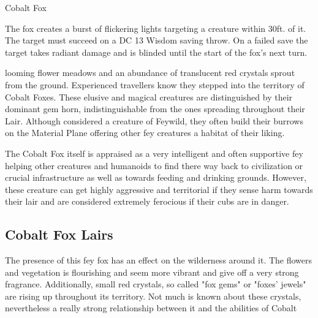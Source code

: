 \begin{DndMonster}[width=0.5\textwidth]{Cobalt Fox\label{monster:CobaltFox}}
    \DndMonsterAttack[
      name=Gore,
      distance=melee, %
      mod=+4,
      reach=5,
      targets=one target,
      dmg=\DndDice{2d6 + 2},
      dmg-type=piercing,
    ]
    
    The fox creates a burst of flickering lights targeting a creature within 30ft. of it. The target must succeed on a DC 13 Wisdom saving throw. On a failed save the target takes  radiant damage and is blinded until the start of the fox's next turn.
      
\end{DndMonster}

\vfill\eject

\vspace*{-6\fontdimen6\font}

\entryfont \noindent {}looming flower meadows and an abundance of translucent red crystals sprout from the ground. Experienced travellers know they stepped into the territory of Cobalt Foxes. These elusive and magical creatures are distinguished by their dominant gem horn, indistinguishable from the ones spreading throughout their Lair. Although considered a creature of Feywild, they often build their burrows on the Material Plane offering other fey creatures a habitat of their liking.

 The Cobalt Fox itself is appraised as a very intelligent and often supportive fey helping other creatures and humanoids to find there way back to civilization or crucial infrastructure as well as towards feeding and drinking grounds. However, these creature can get highly aggressive and territorial if they sense harm towards their lair and are considered extremely ferocious if their cubs are in danger.\\

\subsection*{Cobalt Fox Lairs}
The presence of this fey fox has an effect on the wilderness around it. The flowers and vegetation is flourishing and seem more vibrant and give off a very strong fragrance. Additionally, small red crystals, so called "fox gems" or "foxes' jewels" are rising up throughout its territory. Not much is known about these crystals, nevertheless a really strong relationship between it and the abilities of Cobalt \linebreak

